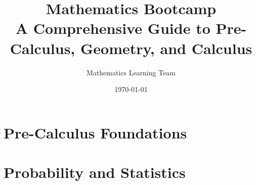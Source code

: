 \documentclass{book}
\title{Mathematics Bootcamp\\
       \large A Comprehensive Guide to Pre-Calculus, Geometry, and Calculus}
\author{Mathematics Learning Team}
\date{\today}
\begin{document}
\maketitle
\tableofcontents

\part{Pre-Calculus Foundations}

% 
% 
% 
% 
% 
% 
% 
% 


% 
% 
% 


% 


\part{Probability and Statistics}

% 

% 
% 
\end{document}
